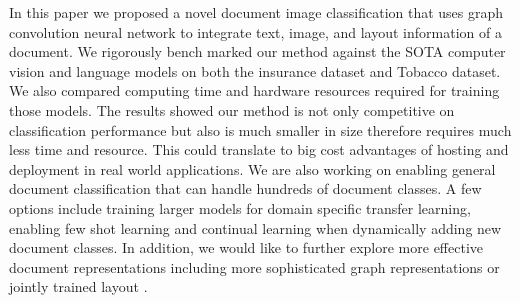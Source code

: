 \documentclass[letterpaper]{article}
\begin{document}
In this paper we proposed a novel document image classification that uses graph convolution neural network to integrate text, image, and layout information of a document. We rigorously bench marked our method against the SOTA computer vision and language models on both the insurance dataset and Tobacco dataset. We also compared computing time and hardware resources required for training those models. The results showed our method is not only competitive on classification performance but also is much smaller in size therefore requires much less time and resource. This could translate to big cost advantages of hosting and deployment in real world applications. We are also working on enabling general document classification that can handle hundreds of document classes. A few options include training larger models for domain specific transfer learning, enabling few shot learning and continual learning when dynamically adding new document classes. In addition, we would like to further explore more effective document representations including more sophisticated graph representations or jointly trained layout \cite{layoutLM}.
 

\end{document}
